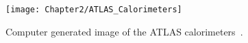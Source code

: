 \begin{figure}
	\centering
 	 \texttt{[image: Chapter2/ATLAS\_Calorimeters]}
	 \caption{Computer generated image of the ATLAS calorimeters~\cite{ATLAS_Web_Detectors}.}
	\label{fig:Chap2:ATLAS:Calorimeters}
\end{figure}









